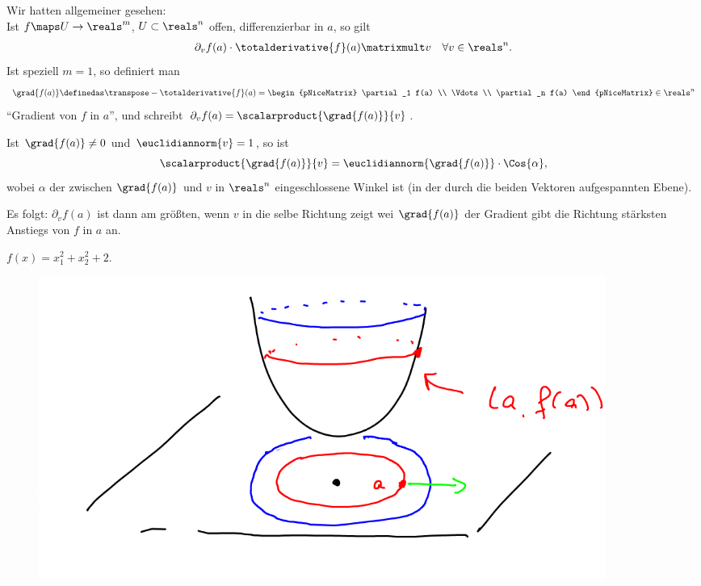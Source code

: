 \begin{bemdef}
    Wir hatten allgemeiner gesehen:\\
    Ist \( f\maps U\to \reals^m \), \( U\subset \reals^n \) offen, differenzierbar in \( a \), so gilt
    \begin{align*}
        \partial_v f(a)\cdot \totalderivative{f}(a)\matrixmult v\quad \forall v\in \reals^n.
    \end{align*}
    Ist speziell \( m=1 \), so definiert man
    \begin{align*}
        \grad{f(a)}\definedas \transpose-{\totalderivative{f}(a)}=\begin{pNiceMatrix} \partial_1 f(a) \\ \Vdots \\ \partial_n f(a) \end{pNiceMatrix}\in \reals^n
    \end{align*}
    \enquote{Gradient von \( f \) in \( a \)}, und schreibt \( \partial_v f(a)=\scalarproduct{\grad{f(a)}}{v} \).

    Ist \( \grad{f(a)}\neq 0 \) und \( \euclidiannorm{v}=1 \), so ist
    \begin{equation*}
        \scalarproduct{\grad{f(a)}}{v}=\euclidiannorm{\grad{f(a)}}\cdot\Cos{\alpha},
    \end{equation*}
    wobei \( \alpha \) der zwischen \( \grad{f(a)} \) und \( v \) in \( \reals^n \) eingeschlossene Winkel ist (in der durch die beiden Vektoren aufgespannten Ebene).

    Es folgt: \( \partial_v f(a) \) ist dann am größten, wenn \( v \) in die selbe Richtung zeigt wei \( \grad{f(a)} \) \timplies der Gradient gibt die Richtung stärksten Anstiegs von \( f \) in \( a \) an.
\end{bemdef}
\begin{beispiel*}
    \( f(x)=x_1^2+x_2^2+2 \).
    \begin{figure}[H]
        \centering
        \includegraphics[width=0.5\linewidth]{figures/gradient_beispiel_parabel}
        \label{fig:gradient_beispiel_parabel}
    \end{figure}
\end{beispiel*}
